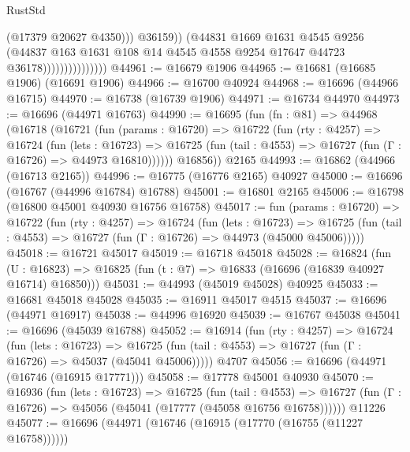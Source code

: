 \begin{lexlean}{RustStd}
\begin{coremodule}
                                      (@17379 @20627 @4350)))
                                  @36159))
                              (@44831
                                @1669
                                @1631
                                @4545
                                @9256
                                (@44837
                                  @163
                                  @1631
                                  @108
                                  @14
                                  @4545
                                  @4558
                                  @9254
                                  @17647
                                  @44723
                                  @36178)))))))))))))))
@44961 := @16679 @1906
@44965 := @16681 (@16685 @1906) (@16691 @1906)
@44966 := @16700 @40924
@44968 := @16696 (@44966 @16715)
@44970 := @16738 (@16739 @1906)
@44971 := @16734 @44970
@44973 := @16696 (@44971 @16763)
@44990 := @16695
    (fun (fn : @81) =>
    @44968
      (@16718
        (@16721
          (fun (params : @16720) =>
          @16722
            (fun (rty : @4257) =>
            @16724
              (fun (lets : @16723) =>
              @16725 (fun (tail : @4553) => @16727 (fun (Γ : @16726) => @44973 @16810))))))
        @16856))
    @2165
@44993 := @16862 (@44966 (@16713 @2165))
@44996 := @16775 (@16776 @2165) @40927
@45000 := @16696 (@16767 (@44996 @16784) @16788)
@45001 := @16801 @2165
@45006 := @16798 (@16800 @45001 @40930 @16756 @16758)
@45017 := fun (params : @16720) =>
  @16722
    (fun (rty : @4257) =>
    @16724
      (fun (lets : @16723) =>
      @16725 (fun (tail : @4553) => @16727 (fun (Γ : @16726) => @44973 (@45000 @45006)))))
@45018 := @16721 @45017
@45019 := @16718 @45018
@45028 := @16824
    (fun (U : @16823) => @16825 (fun (t : @7) => @16833 (@16696 (@16839 @40927 @16714) @16850)))
@45031 := @44993 (@45019 @45028) @40925
@45033 := @16681 @45018 @45028
@45035 := @16911 @45017 @4515
@45037 := @16696 (@44971 @16917)
@45038 := @44996 @16920
@45039 := @16767 @45038
@45041 := @16696 (@45039 @16788)
@45052 := @16914
    (fun (rty : @4257) =>
    @16724
      (fun (lets : @16723) =>
      @16725 (fun (tail : @4553) => @16727 (fun (Γ : @16726) => @45037 (@45041 @45006)))))
    @4707
@45056 := @16696 (@44971 (@16746 (@16915 @17771)))
@45058 := @17778 @45001 @40930
@45070 := @16936
    (fun (lets : @16723) =>
    @16725
      (fun (tail : @4553) =>
      @16727 (fun (Γ : @16726) => @45056 (@45041 (@17777 (@45058 @16756 @16758))))))
    @11226
@45077 := @16696 (@44971 (@16746 (@16915 (@17770 (@16755 (@11227 @16758))))))

\end{coremodule}
\end{lexlean}
